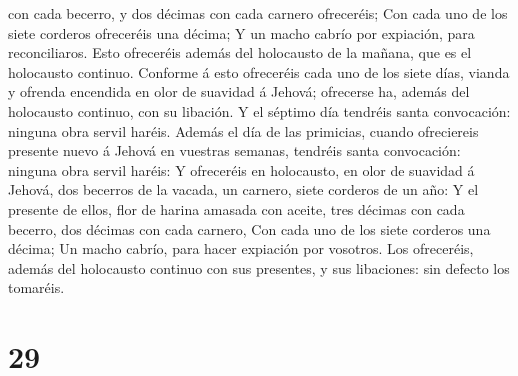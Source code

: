 con cada becerro, y dos décimas con cada carnero ofreceréis;
 Con cada uno de los siete corderos ofreceréis una
décima;  Y un macho cabrío por expiación, para
reconciliaros.  Esto ofreceréis además del holocausto de
la mañana, que es el holocausto continuo.  Conforme á
esto ofreceréis cada uno de los siete días, vianda y ofrenda encendida
en olor de suavidad á Jehová; ofrecerse ha, además del holocausto
continuo, con su libación.  Y el séptimo día tendréis
santa convocación: ninguna obra servil haréis.  Además el
día de las primicias, cuando ofreciereis presente nuevo á Jehová en
vuestras semanas, tendréis santa convocación: ninguna obra servil
haréis:  Y ofreceréis en holocausto, en olor de suavidad
á Jehová, dos becerros de la vacada, un carnero, siete corderos de un
año:  Y el presente de ellos, flor de harina amasada con
aceite, tres décimas con cada becerro, dos décimas con cada carnero,
 Con cada uno de los siete corderos una décima;
 Un macho cabrío, para hacer expiación por vosotros.
 Los ofreceréis, además del holocausto continuo con sus
presentes, y sus libaciones: sin defecto los tomaréis.

\hypertarget{section-28}{%
\section{29}\label{section-28}}


